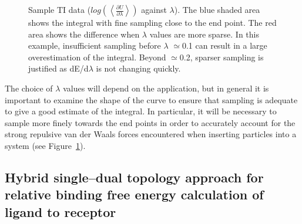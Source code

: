 \begin{figure}[tbp]
  \caption{Sample TI data ($log(\left<\frac{\partial U}{\partial\lambda}\right>)$ against $\lambda$). The blue shaded
  area shows the integral with fine sampling close to the end point. The red area
  shows the difference when $\lambda$ values are more sparse. In this example,
  insufficient sampling before $\lambda$ $\simeq$0.1 can result in a large overestimation
  of the integral. Beyond $\simeq$0.2, sparser sampling is justified as dE/d$\lambda$ is not
  changing quickly.}
  \label{fig:TI}
\end{figure}


The choice of $\lambda$ values will depend on the application, but in general
it is important to examine the shape of the curve to ensure that sampling is
adequate to give a good estimate of the integral. In particular, it will be
necessary to sample more finely towards the end points in order to accurately
account for the strong repulsive van der Waals forces encountered when
inserting particles into a system (see Figure~\ref{fig:TI}).


\subsection{Hybrid single--dual topology approach for relative binding
free energy calculation of ligand to receptor}

